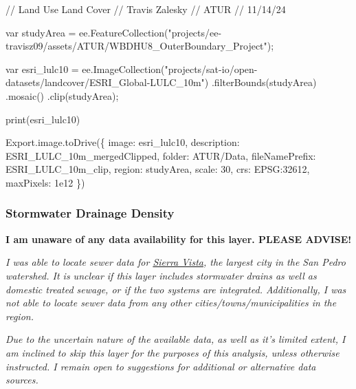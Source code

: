 \documentclass[
]{agujournal2019}
\newenvironment{Shaded}{\begin{snugshade}}{\end{snugshade}}
\newcommand{\NormalTok}[1]{\textcolor[rgb]{0.00,0.23,0.31}{#1}}
\begin{document}
\begin{Shaded}
\begin{Highlighting}[]
\NormalTok{// Land Use Land Cover}
\NormalTok{// Travis Zalesky}
\NormalTok{// ATUR}
\NormalTok{// 11/14/24}

\NormalTok{var studyArea = ee.FeatureCollection("projects/ee{-}travisz09/assets/ATUR/WBDHU8\_OuterBoundary\_Project");}

\NormalTok{var esri\_lulc10 = ee.ImageCollection("projects/sat{-}io/open{-}datasets/landcover/ESRI\_Global{-}LULC\_10m")}
\NormalTok{  .filterBounds(studyArea)}
\NormalTok{  .mosaic()}
\NormalTok{  .clip(studyArea);}
  
\NormalTok{print(esri\_lulc10)}

\NormalTok{Export.image.toDrive(\{}
\NormalTok{  image: esri\_lulc10, }
\NormalTok{  description: \textquotesingle{}ESRI\_LULC\_10m\_mergedClipped\textquotesingle{},}
\NormalTok{  folder: \textquotesingle{}ATUR/Data\textquotesingle{},}
\NormalTok{  fileNamePrefix: \textquotesingle{}ESRI\_LULC\_10m\_clip\textquotesingle{},}
\NormalTok{  region: studyArea,}
\NormalTok{  scale: 30,}
\NormalTok{  crs: \textquotesingle{}EPSG:32612\textquotesingle{},}
\NormalTok{  maxPixels: 1e12}
\NormalTok{\})}
\end{Highlighting}
\end{Shaded}

\subsubsection{Stormwater Drainage
Density}\label{stormwater-drainage-density}

\textbf{I am unaware of any data availability for this layer. PLEASE
ADVISE!}

\begin{tcolorbox}[enhanced jigsaw, coltitle=black, opacityback=0, colframe=quarto-callout-note-color-frame, colbacktitle=quarto-callout-note-color!10!white, bottomrule=.15mm, leftrule=.75mm, toprule=.15mm, breakable, colback=white, title=\textcolor{quarto-callout-note-color}{\faInfo}\hspace{0.5em}{Note}, bottomtitle=1mm, left=2mm, opacitybacktitle=0.6, rightrule=.15mm, toptitle=1mm, titlerule=0mm, arc=.35mm]

\emph{I was able to locate sewer data for
\href{https://cosvazgis-sierravista.hub.arcgis.com/maps/bd8411bd3f1a485395f057636aa94b09/explore?location=31.560760\%2C-110.206043\%2C-1.00}{Sierra
Vista}, the largest city in the San Pedro watershed. It is unclear if
this layer includes stormwater drains as well as domestic treated
sewage, or if the two systems are integrated. Additionally, I was not
able to locate sewer data from any other cities/towns/municipalities in
the region.}

\emph{Due to the uncertain nature of the available data, as well as it's
limited extent, I am inclined to skip this layer for the purposes of
this analysis, unless otherwise instructed. I remain open to suggestions
for additional or alternative data sources.}

\end{tcolorbox}
\end{document}
